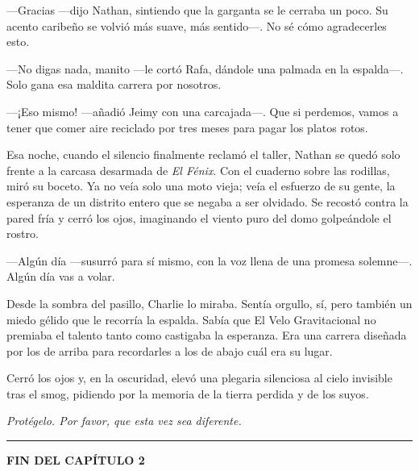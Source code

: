 \documentclass[12pt,a4paper]{book}
\begin{document}
---Gracias ---dijo Nathan, sintiendo que la garganta se le cerraba un poco. Su acento caribeño se volvió más suave, más sentido---. No sé cómo agradecerles esto.

---No digas nada, manito ---le cortó Rafa, dándole una palmada en la espalda---. Solo gana esa maldita carrera por nosotros.

---¡Eso mismo! ---añadió Jeimy con una carcajada---. Que si perdemos, vamos a tener que comer aire reciclado por tres meses para pagar los platos rotos.

Esa noche, cuando el silencio finalmente reclamó el taller, Nathan se quedó solo frente a la carcasa desarmada de \textit{El Fénix}. Con el cuaderno sobre las rodillas, miró su boceto. Ya no veía solo una moto vieja; veía el esfuerzo de su gente, la esperanza de un distrito entero que se negaba a ser olvidado. Se recostó contra la pared fría y cerró los ojos, imaginando el viento puro del domo golpeándole el rostro.

---Algún día ---susurró para sí mismo, con la voz llena de una promesa solemne---. Algún día vas a volar.

Desde la sombra del pasillo, Charlie lo miraba. Sentía orgullo, sí, pero también un miedo gélido que le recorría la espalda. Sabía que El Velo Gravitacional no premiaba el talento tanto como castigaba la esperanza. Era una carrera diseñada por los de arriba para recordarles a los de abajo cuál era su lugar.

Cerró los ojos y, en la oscuridad, elevó una plegaria silenciosa al cielo invisible tras el smog, pidiendo por la memoria de la tierra perdida y de los suyos.

\textit{Protégelo. Por favor, que esta vez sea diferente.}

\bigskip
\noindent\rule{\textwidth}{0.4pt}
\bigskip

\textbf{FIN DEL CAPÍTULO 2}
\end{document}
